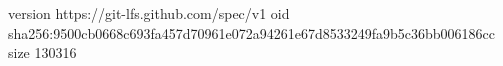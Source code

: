 version https://git-lfs.github.com/spec/v1
oid sha256:9500cb0668c693fa457d70961e072a94261e67d8533249fa9b5c36bb006186cc
size 130316
